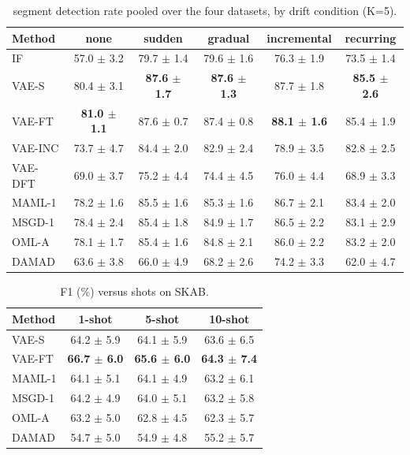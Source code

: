 \begin{table}[t]
\centering
\small
\caption{segment detection rate pooled over the four datasets, by drift condition (K=5).}
\label{tab:drift_segment_detection_rate_all}
\begin{tabular}{lccccc}
\toprule
Method & none & sudden & gradual & incremental & recurring \\
\midrule
IF & 57.0 $\pm$ 3.2 & 79.7 $\pm$ 1.4 & 79.6 $\pm$ 1.6 & 76.3 $\pm$ 1.9 & 73.5 $\pm$ 1.4 \\
VAE-S & 80.4 $\pm$ 3.1 & \textbf{87.6 $\pm$ 1.7} & \textbf{87.6 $\pm$ 1.3} & 87.7 $\pm$ 1.8 & \textbf{85.5 $\pm$ 2.6} \\
VAE-FT & \textbf{81.0 $\pm$ 1.1} & 87.6 $\pm$ 0.7 & 87.4 $\pm$ 0.8 & \textbf{88.1 $\pm$ 1.6} & 85.4 $\pm$ 1.9 \\
VAE-INC & 73.7 $\pm$ 4.7 & 84.4 $\pm$ 2.0 & 82.9 $\pm$ 2.4 & 78.9 $\pm$ 3.5 & 82.8 $\pm$ 2.5 \\
VAE-DFT & 69.0 $\pm$ 3.7 & 75.2 $\pm$ 4.4 & 74.4 $\pm$ 4.5 & 76.0 $\pm$ 4.4 & 68.9 $\pm$ 3.3 \\
MAML-1 & 78.2 $\pm$ 1.6 & 85.5 $\pm$ 1.6 & 85.3 $\pm$ 1.6 & 86.7 $\pm$ 2.1 & 83.4 $\pm$ 2.0 \\
MSGD-1 & 78.4 $\pm$ 2.4 & 85.4 $\pm$ 1.8 & 84.9 $\pm$ 1.7 & 86.5 $\pm$ 2.2 & 83.1 $\pm$ 2.9 \\
OML-A & 78.1 $\pm$ 1.7 & 85.4 $\pm$ 1.6 & 84.8 $\pm$ 2.1 & 86.0 $\pm$ 2.2 & 83.2 $\pm$ 2.0 \\
DAMAD & 63.6 $\pm$ 3.8 & 66.0 $\pm$ 4.9 & 68.2 $\pm$ 2.6 & 74.2 $\pm$ 3.3 & 62.0 $\pm$ 4.7 \\
\bottomrule
\end{tabular}
\end{table}

\begin{table}[t]
\centering
\small
\caption{F1 (\%) versus shots on SKAB.}
\label{tab:shots_skab}
\begin{tabular}{lccc}
\toprule
Method & 1-shot & 5-shot & 10-shot \\
\midrule
VAE-S & 64.2 $\pm$ 5.9 & 64.1 $\pm$ 5.9 & 63.6 $\pm$ 6.5 \\
VAE-FT & \textbf{66.7 $\pm$ 6.0} & \textbf{65.6 $\pm$ 6.0} & \textbf{64.3 $\pm$ 7.4} \\
MAML-1 & 64.1 $\pm$ 5.1 & 64.1 $\pm$ 4.9 & 63.2 $\pm$ 6.1 \\
MSGD-1 & 64.2 $\pm$ 4.9 & 64.0 $\pm$ 5.1 & 63.2 $\pm$ 5.8 \\
OML-A & 63.2 $\pm$ 5.0 & 62.8 $\pm$ 4.5 & 62.3 $\pm$ 5.7 \\
DAMAD & 54.7 $\pm$ 5.0 & 54.9 $\pm$ 4.8 & 55.2 $\pm$ 5.7 \\
\bottomrule
\end{tabular}
\end{table}

